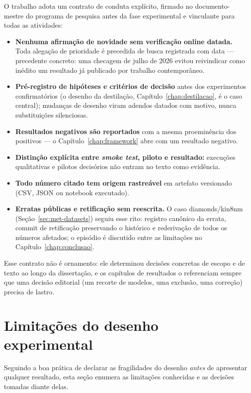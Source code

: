 O trabalho adota um contrato de conduta explícito, firmado no documento-mestre
do programa de pesquisa antes da fase experimental e vinculante para todas as
atividades:

\begin{itemize}
  \item \textbf{Nenhuma afirmação de novidade sem verificação online
    datada.} Toda alegação de prioridade é precedida de busca registrada com
    data --- precedente concreto: uma checagem de julho de 2026 evitou
    reivindicar como inédito um resultado já publicado por trabalho
    contemporâneo.
  \item \textbf{Pré-registro de hipóteses e critérios de decisão} antes dos
    experimentos confirmatórios (o desenho da destilação,
    Capítulo~\ref{chap:destilacao}, é o caso central); mudanças de desenho
    viram adendos datados com motivo, nunca substituições silenciosas.
  \item \textbf{Resultados negativos são reportados} com a mesma
    proeminência dos positivos --- o Capítulo~\ref{chap:framework} abre com
    um resultado negativo.
  \item \textbf{Distinção explícita entre \emph{smoke test}, piloto e
    resultado:} execuções qualitativas e pilotos decisórios não entram no
    texto como evidência.
  \item \textbf{Todo número citado tem origem rastreável} em artefato
    versionado (CSV, JSON ou notebook executado).
  \item \textbf{Erratas públicas e retificação sem reescrita.} O caso
    diamonds/kin8nm (Seção~\ref{sec:met-datasets}) seguiu esse rito: registro
    canônico da errata, commit de retificação preservando o histórico e
    rederivação de todos os números afetados; o episódio é discutido entre
    as limitações no Capítulo~\ref{chap:conclusao}.
\end{itemize}

Esse contrato não é ornamento: ele determinou decisões concretas de escopo e
de texto ao longo da dissertação, e os capítulos de resultados o referenciam
sempre que uma decisão editorial (um recorte de modelos, uma exclusão, uma
correção) precisa de lastro.

\section{Limitações do desenho experimental}
\label{sec:met-limitacoes}

Seguindo a boa prática de declarar as fragilidades do desenho \emph{antes}
de apresentar qualquer resultado, esta seção enumera as limitações
conhecidas e as decisões tomadas diante delas.

